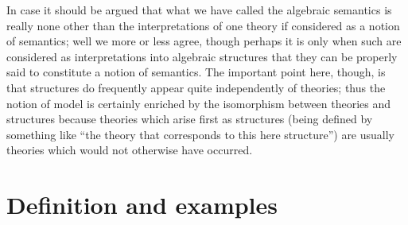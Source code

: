In case it should be argued that what we have called the algebraic semantics is really none other than the interpretations of one theory if considered as a notion of semantics; well we more or less agree, though perhaps it is only when such are considered as interpretations into algebraic structures that they can be properly said to constitute a notion of semantics.
%
The important point here, though, is that structures do frequently appear quite independently of theories; thus the notion of model is certainly enriched by the isomorphism between theories and structures because theories which arise first as structures (being defined by something like ``the theory that corresponds to this here structure'') are usually theories which would not otherwise have occurred.
%
%

\section{Definition and examples} \label{sec:source-2-2}

